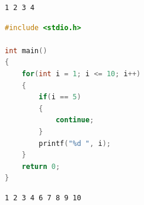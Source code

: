 \begin{tcolorbox}
	\begin{verbatim}
1 2 3 4 
\end{verbatim}
\end{tcolorbox}

\vspace{0.5cm}


\begin{lstlisting}[language=C]
#include <stdio.h>

int main()
{
    for(int i = 1; i <= 10; i++)
    {
        if(i == 5)
        {
            continue;
        }
        printf("%d ", i);
    }
    return 0;
}
\end{lstlisting}

\begin{tcolorbox}
	\begin{verbatim}
1 2 3 4 6 7 8 9 10 
\end{verbatim}
\end{tcolorbox}

\newpage